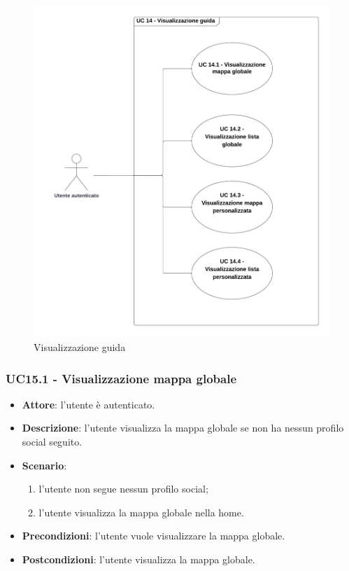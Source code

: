 \begin{figure}[H]
    \includegraphics[width=13cm]{sezioni/Images/UC14_s.png}
    \centering
    \caption{Visualizzazione guida}
\end{figure}

\subsubsection{UC15.1 - Visualizzazione mappa globale}
\begin{itemize}
    \item \textbf{Attore}: l'utente è autenticato.
    \item \textbf{Descrizione}: l'utente visualizza la mappa globale se non ha nessun profilo social seguito.
    \item \textbf{Scenario}:
    \begin{enumerate}
        \item l'utente non segue nessun profilo social;
        \item l'utente visualizza la mappa globale nella home.
    \end{enumerate}

    \item \textbf{Precondizioni}: l'utente vuole visualizzare la mappa globale.
    \item \textbf{Postcondizioni}: l'utente visualizza la mappa globale.
\end{itemize}

